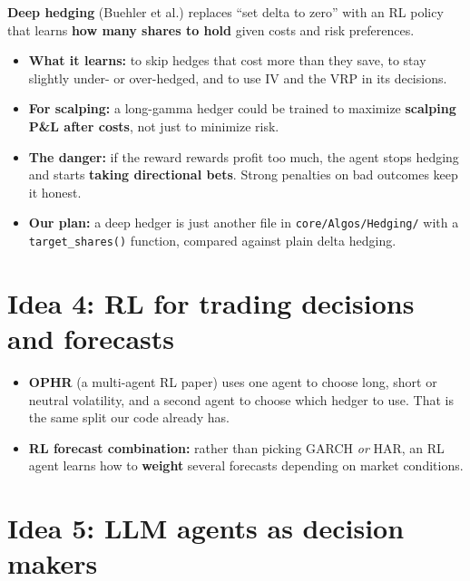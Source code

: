 \documentclass{article}
\begin{document}
\textbf{Deep hedging} (Buehler et al.) replaces ``set delta to zero'' with an RL policy that learns \textbf{how many shares to hold} given costs and risk preferences.

\begin{itemize}

\item \textbf{What it learns:} to skip hedges that cost more than they save, to stay slightly under- or over-hedged, and to use IV and the VRP in its decisions.

\item \textbf{For scalping:} a long-gamma hedger could be trained to maximize \textbf{scalping P\&L after costs}, not just to minimize risk.

\item \textbf{The danger:} if the reward rewards profit too much, the agent stops hedging and starts \textbf{taking directional bets}. Strong penalties on bad outcomes keep it honest.

\item \textbf{Our plan:} a deep hedger is just another file in \texttt{core/\allowbreak{}Algos/\allowbreak{}Hedging/\allowbreak{}} with a \texttt{target\_\allowbreak{}shares()} function, compared against plain delta hedging.

\end{itemize}

\section{Idea 4: RL for trading decisions and forecasts}

\begin{itemize}

\item \textbf{OPHR} (a multi-agent RL paper) uses one agent to choose long, short or neutral volatility, and a second agent to choose which hedger to use. That is the same split our code already has.

\item \textbf{RL forecast combination:} rather than picking GARCH \emph{or} HAR, an RL agent learns how to \textbf{weight} several forecasts depending on market conditions.

\end{itemize}

\section{Idea 5: LLM agents as decision makers}
\end{document}
